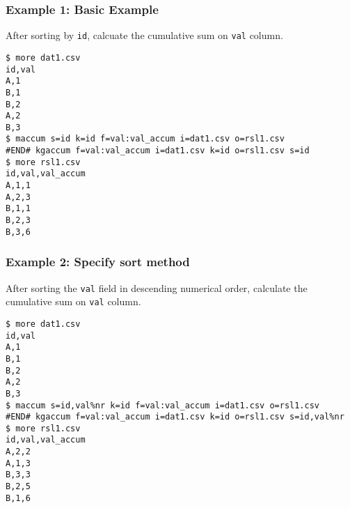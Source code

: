 \subsubsection*{Example 1: Basic Example }

After sorting by \verb|id|, calcuate the cumulative sum on \verb|val| column.


\begin{Verbatim}[baselinestretch=0.7,frame=single]
$ more dat1.csv
id,val
A,1
B,1
B,2
A,2
B,3
$ maccum s=id k=id f=val:val_accum i=dat1.csv o=rsl1.csv
#END# kgaccum f=val:val_accum i=dat1.csv k=id o=rsl1.csv s=id
$ more rsl1.csv
id,val,val_accum
A,1,1
A,2,3
B,1,1
B,2,3
B,3,6
\end{Verbatim}
\subsubsection*{Example 2: Specify sort method}

After sorting the \verb|val| field in descending numerical order, calculate the cumulative sum on \verb|val| column.


\begin{Verbatim}[baselinestretch=0.7,frame=single]
$ more dat1.csv
id,val
A,1
B,1
B,2
A,2
B,3
$ maccum s=id,val%nr k=id f=val:val_accum i=dat1.csv o=rsl1.csv
#END# kgaccum f=val:val_accum i=dat1.csv k=id o=rsl1.csv s=id,val%nr
$ more rsl1.csv
id,val,val_accum
A,2,2
A,1,3
B,3,3
B,2,5
B,1,6
\end{Verbatim}
